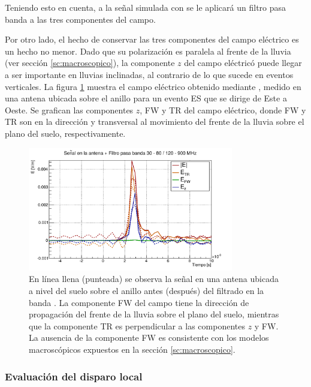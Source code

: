 	Teniendo esto en cuenta, a la se\~nal simulada con \zhs{} se le aplicar\'a un filtro pasa banda  a las tres componentes del campo.
	
	Por otro lado, el hecho de conservar las tres componentes del campo el\'ectrico es un hecho no menor.
	Dado que su polarizaci\'on es paralela al frente de la lluvia (ver secci\'on \ref{sc:macroscopico}), la componente $z$ del campo el\'ectric\'o puede llegar a ser importante en lluvias inclinadas, al contrario de lo que sucede en eventos verticales.
	La figura \ref{fig:antSig} muestra el campo el\'ectrico obtenido mediante \zhs{}, medido en una antena ubicada sobre el anillo \cher{} para un evento ES que se dirige de Este a Oeste.
	Se grafican las componentes $z$, FW y TR del campo eléctrico, donde FW y TR son en la direcci\'on y transversal al movimiento del frente de la lluvia sobre el plano del suelo, respectivamente.
	
	\begin{figure}[ht!]
		\centering
		\includegraphics[width=0.8\textwidth]{./fig/simulacionRadio/antennaFilt}
		\caption{\label{fig:antSig}
		En l\'inea llena (punteada) se observa la señal en una antena ubicada a nivel del suelo sobre el anillo \cher{} antes (despu\'es) del filtrado en la banda .  
		La componente FW del campo tiene la direcci\'on de propagaci\'on del frente de la lluvia sobre el plano del suelo, mientras que la componente TR es perpendicular a las componentes $z$ y FW.
		La ausencia de la componente FW es consistente con los modelos macrosc\'opicos expuestos en la secci\'on \ref{sc:macroscopico}.
		}
	\end{figure}
	
	\subsubsection{Evaluaci\'on del disparo local}
	
